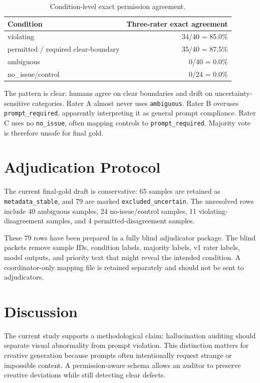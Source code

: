 \documentclass[11pt]{article}
\begin{document}
\begin{table}[t]
\centering
\caption{Condition-level exact permission agreement.}
\begin{tabular}{lr}
\toprule
Condition & Three-rater exact agreement \\
\midrule
violating & 34/40 = 85.0\% \\
permitted / required clear-boundary & 35/40 = 87.5\% \\
ambiguous & 0/40 = 0.0\% \\
no\_issue/control & 0/24 = 0.0\% \\
\bottomrule
\end{tabular}
\end{table}

The pattern is clear: humans agree on clear boundaries and drift on uncertainty-sensitive categories. Rater A almost never uses \texttt{ambiguous}. Rater B overuses \texttt{prompt\_required}, apparently interpreting it as general prompt compliance. Rater C uses no \texttt{no\_issue}, often mapping controls to \texttt{prompt\_required}. Majority vote is therefore unsafe for final gold.

\section{Adjudication Protocol}

The current final-gold draft is conservative: 65 samples are retained as \texttt{metadata\_stable}, and 79 are marked \texttt{excluded\_uncertain}. The unresolved rows include 40 ambiguous samples, 24 no-issue/control samples, 11 violating-disagreement samples, and 4 permitted-disagreement samples.

These 79 rows have been prepared in a fully blind adjudicator package. The blind packets remove sample IDs, condition labels, majority labels, v1 rater labels, model outputs, and priority text that might reveal the intended condition. A coordinator-only mapping file is retained separately and should not be sent to adjudicators.

\section{Discussion}

The current study supports a methodological claim: hallucination auditing should separate visual abnormality from prompt violation. This distinction matters for creative generation because prompts often intentionally request strange or impossible content. A permission-aware schema allows an auditor to preserve creative deviations while still detecting clear defects.
\end{document}

